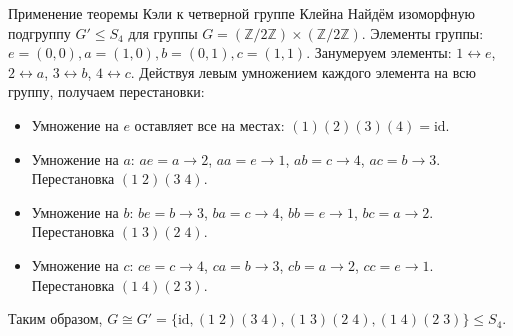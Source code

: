 \begin{Example}{Применение теоремы Кэли к четверной группе Клейна}{}
	Найдём изоморфную подгруппу $G' \le S_4$ для группы $G = (\mathbb{Z}/2\mathbb{Z}) \times (\mathbb{Z}/2\mathbb{Z})$.
	Элементы группы: $e=(0,0), a=(1,0), b=(0,1), c=(1,1)$.
	Занумеруем элементы: $1 \leftrightarrow e$, $2 \leftrightarrow a$, $3 \leftrightarrow b$, $4 \leftrightarrow c$.
	Действуя левым умножением каждого элемента на всю группу, получаем перестановки:
	\begin{itemize}
		\item Умножение на $e$ оставляет все на местах: $(1)(2)(3)(4) = \text{id}$.
		\item Умножение на $a$: $ae=a \to 2$, $aa=e \to 1$, $ab=c \to 4$, $ac=b \to 3$. Перестановка $(1\;2)(3\;4)$.
		\item Умножение на $b$: $be=b \to 3$, $ba=c \to 4$, $bb=e \to 1$, $bc=a \to 2$. Перестановка $(1\;3)(2\;4)$.
		\item Умножение на $c$: $ce=c \to 4$, $ca=b \to 3$, $cb=a \to 2$, $cc=e \to 1$. Перестановка $(1\;4)(2\;3)$.
	\end{itemize}
	Таким образом, $G \cong G' = \{\text{id}, (1\;2)(3\;4), (1\;3)(2\;4), (1\;4)(2\;3)\} \le S_4$.
\end{Example}
